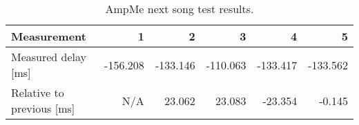 \begin{table}[h]
\centering
\begin{tabular}{|l|r|r|r|r|r|}
\hline
Measurement                 & 1         & 2        & 3        & 4        & 5         \\ \hline
Measured delay [ms]         & -156.208  & -133.146 & -110.063 & -133.417 & -133.562  \\ \hline
Relative to previous [ms]   & N/A       & 23.062   & 23.083   & -23.354   & -0.145    \\ \hline
\end{tabular}
\caption{AmpMe next song test results.}
\label{fig:ampmenextsongfigure}
\end{table}
